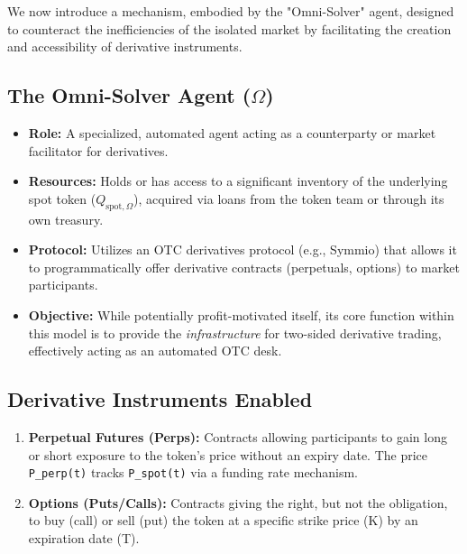 \documentclass{article}
\begin{document}
We now introduce a mechanism, embodied by the "Omni-Solver" agent, designed to counteract the inefficiencies of the isolated market by facilitating the creation and accessibility of derivative instruments.

\subsection{The Omni-Solver Agent ($\Omega$)}
\begin{itemize}
    \item \textbf{Role:} A specialized, automated agent acting as a counterparty or market facilitator for derivatives.
    \item \textbf{Resources:} Holds or has access to a significant inventory of the underlying spot token ($Q_{\text{spot},\Omega}$), acquired via loans from the token team or through its own treasury.
    \item \textbf{Protocol:} Utilizes an OTC derivatives protocol (e.g., Symmio) that allows it to programmatically offer derivative contracts (perpetuals, options) to market participants.
    \item \textbf{Objective:} While potentially profit-motivated itself, its core function within this model is to provide the \textit{infrastructure} for two-sided derivative trading, effectively acting as an automated OTC desk.
\end{itemize}

\subsection{Derivative Instruments Enabled}
\begin{enumerate}
    \item \textbf{Perpetual Futures (Perps):} Contracts allowing participants to gain long or short exposure to the token's price without an expiry date. The price \lstinline{P_perp(t)} tracks \lstinline{P_spot(t)} via a funding rate mechanism.
    \item \textbf{Options (Puts/Calls):} Contracts giving the right, but not the obligation, to buy (call) or sell (put) the token at a specific strike price (K) by an expiration date (T).
\end{enumerate}
\end{document}
